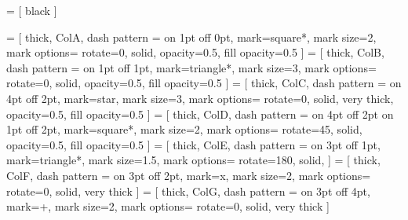 \newlength{\wdtwenty}


 = [
	black
]


 = [
thick, ColA, dash pattern = {on 1pt off 0pt},
mark=square*, mark size=2, mark options={
	rotate=0,
	solid,
	opacity=0.5,
	fill opacity=0.5
}
]
 = [
thick, ColB, dash pattern = {on 1pt off 1pt},
mark=triangle*, mark size=3, mark options={
	rotate=0,
	solid,
	opacity=0.5,
	fill opacity=0.5
}
]
 = [
thick, ColC, dash pattern = {on 4pt off 2pt},
mark=star, mark size=3, mark options={
	rotate=0,
	solid,
	very thick,
	opacity=0.5,
	fill opacity=0.5
}
]
 = [
thick, ColD, dash pattern = {on 4pt off 2pt on 1pt off 2pt},
mark=square*, mark size=2, mark options={
	rotate=45,
	solid,
	opacity=0.5,
	fill opacity=0.5
}
]
 = [
thick, ColE, dash pattern = {on 3pt off 1pt},
mark=triangle*, mark size=1.5, mark options={
	rotate=180,
	solid,
}
]
 = [
thick, ColF, dash pattern = {on 3pt off 2pt},
mark=x, mark size=2, mark options={
	rotate=0,
	solid,
	very thick
}
]
 = [
thick, ColG, dash pattern = {on 3pt off 4pt},
mark=+, mark size=2, mark options={
	rotate=0,
	solid,
	very thick
}
]
